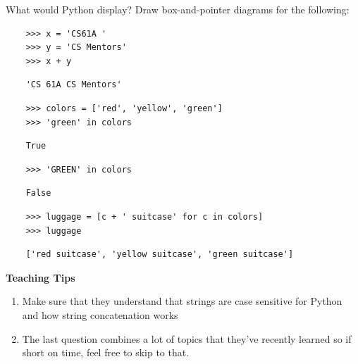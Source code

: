 \begin{blocksection}
    \question What would Python display? Draw box-and-pointer diagrams for the following:
    
    \begin{lstlisting}
    >>> x = 'CS61A '
    >>> y = 'CS Mentors'
    >>> x + y
    \end{lstlisting}
    \begin{solution}[.25in]
    \begin{lstlisting}
    'CS 61A CS Mentors'
    \end{lstlisting}
    \end{solution}
    
    \begin{lstlisting}
    >>> colors = ['red', 'yellow', 'green']
    >>> 'green' in colors
    \end{lstlisting}
    \begin{solution}[.25in]
    \begin{lstlisting}
    True
    \end{lstlisting}
    \end{solution}
    \end{blocksection}
    \begin{blocksection}
    
    \begin{lstlisting}
    >>> 'GREEN' in colors
    \end{lstlisting}
    \begin{solution}[.25in]
    \begin{lstlisting}
    False
    \end{lstlisting}
    \end{solution}
    \begin{lstlisting}
    >>> luggage = [c + ' suitcase' for c in colors]
    >>> luggage
    \end{lstlisting}
    \begin{solution}[.25in]
    \begin{lstlisting}
    ['red suitcase', 'yellow suitcase', 'green suitcase']
    \end{lstlisting}
    \end{solution}
\end{blocksection}
        
        
    \begin{questionmeta}
        \textbf{Teaching Tips}
        \begin{enumerate}
                \item Make sure that they understand that strings are case sensitive for Python and how string concatenation works
                \item The last question combines a lot of topics that they've recently learned so if short on time, feel free to skip to that. 
        \end{enumerate}
    \end{questionmeta}
